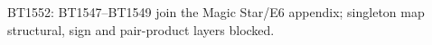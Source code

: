 \begin{center}\small
BT1552: BT1547--BT1549 join the Magic Star/E6 appendix; singleton map structural, sign and pair-product layers blocked.
\end{center}
